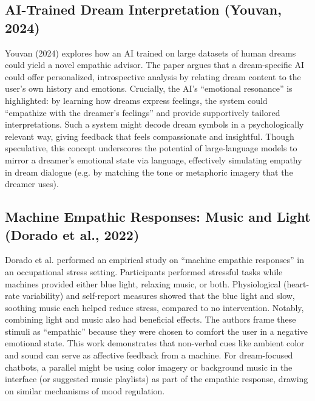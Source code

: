 \documentclass[conference]{IEEEtran}
\begin{document}
    \subsection{AI-Trained Dream Interpretation (Youvan, 2024)}
    Youvan (2024) explores how an AI trained on large datasets of human dreams could yield a novel empathic advisor. The paper argues that a dream-specific AI could offer personalized, introspective analysis by relating dream content to the user’s own history and emotions. Crucially, the AI’s “emotional resonance” is highlighted: by learning how dreams express feelings, the system could “empathize with the dreamer’s feelings” and provide supportively tailored interpretations. Such a system might decode dream symbols in a psychologically relevant way, giving feedback that feels compassionate and insightful. Though speculative, this concept underscores the potential of large-language models to mirror a dreamer’s emotional state via language, effectively simulating empathy in dream dialogue (e.g. by matching the tone or metaphoric imagery that the dreamer uses).

    \subsection{Machine Empathic Responses: Music and Light (Dorado et al., 2022)}
    Dorado et al. performed an empirical study on “machine empathic responses” in an occupational stress setting. Participants performed stressful tasks while machines provided either blue light, relaxing music, or both. Physiological (heart-rate variability) and self-report measures showed that the blue light and slow, soothing music each helped reduce stress, compared to no intervention. Notably, combining light and music also had beneficial effects. The authors frame these stimuli as “empathic” because they were chosen to comfort the user in a negative emotional state. This work demonstrates that non-verbal cues like ambient color and sound can serve as affective feedback from a machine. For dream-focused chatbots, a parallel might be using color imagery or background music in the interface (or suggested music playlists) as part of the empathic response, drawing on similar mechanisms of mood regulation.
\end{document}
